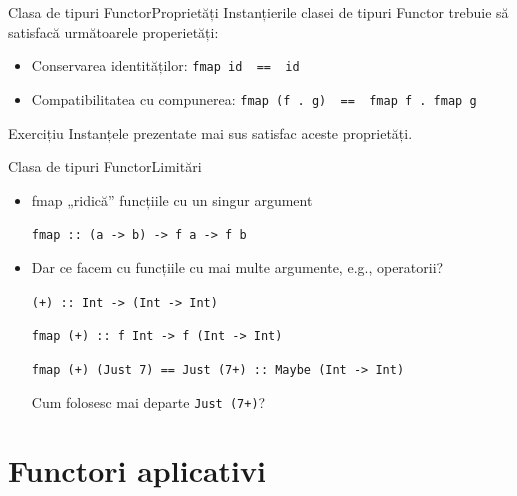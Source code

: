 \documentclass[xcolor=pdftex,romanian,colorlinks]{beamer}
\begin{document}
\begin{frame}[fragile]{Clasa de tipuri Functor}{Proprietăți}
Instanțierile clasei de tipuri Functor trebuie să satisfacă următoarele properietăți:
\begin{itemize}
\item Conservarea identităților: \lstinline$fmap id  ==  id$
\item Compatibilitatea cu compunerea: \lstinline$fmap (f . g)  ==  fmap f . fmap g$
\end{itemize}

\begin{block}{Exercițiu}
Instanțele prezentate mai sus satisfac aceste proprietăți.
\end{block}
\end{frame}

\begin{frame}[fragile]{Clasa de tipuri Functor}{Limitări}
\begin{itemize}
\item fmap „ridică” funcțiile cu un singur argument

\lstinline$fmap :: (a -> b) -> f a -> f b$
\item Dar ce facem cu funcțiile cu mai multe argumente, e.g., operatorii?

\lstinline$(+) :: Int -> (Int -> Int)$

\lstinline$fmap (+) :: f Int -> f (Int -> Int)$

\lstinline$fmap (+) (Just 7) == Just (7+) :: Maybe (Int -> Int)$

Cum folosesc mai departe \lstinline$Just (7+)$?
\end{itemize}
\end{frame}

\section{Functori aplicativi}
\end{document}
